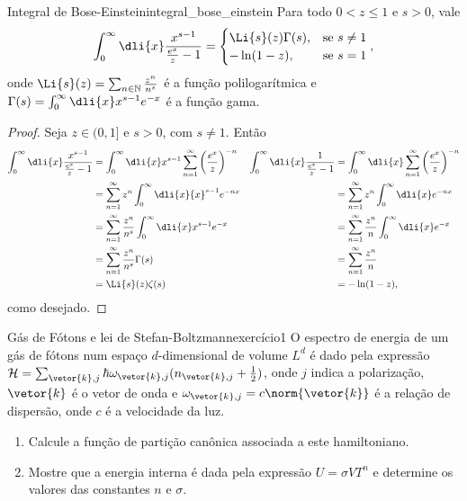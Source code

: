 \begin{lemma}{Integral de Bose-Einstein}{integral_bose_einstein}
    Para todo \(0 < z \leq 1\) e \(s > 0\), vale
    \begin{equation*}
        \int_0^\infty \dli{x} \frac{x^{s-1}}{\frac{e^x}{z} - 1} = \begin{cases}
            \Li{s}(z)\Gamma(s),&\text{se }s \neq 1\\
            -\ln(1 - z),&\text{se }s = 1
        \end{cases},
    \end{equation*}
    onde \(\Li{s}(z) = \sum_{n\in \mathbb{N}}\frac{z^n}{n^s}\) é a função polilogarítmica e \(\Gamma(s) = \int_0^\infty\dli{x} x^{s-1} e^{-x}\) é a função gama.
\end{lemma}
\begin{proof}
    Seja \(z \in (0,1]\) e \(s > 0\), com \(s \neq 1\). Então
    \begin{align*}
        \int_0^\infty \dli{x} \frac{x^{s-1}}{\frac{e^x}{z} - 1} &= \int_0^\infty\dli{x} x^{s-1} \sum_{n = 1}^\infty \left(\frac{e^{x}}{z}\right)^{-n} &
        \int_0^\infty \dli{x} \frac{1}{\frac{e^x}{z} - 1} &= \int_0^\infty\dli{x} \sum_{n = 1}^\infty \left(\frac{e^{x}}{z}\right)^{-n} \\
        &= \sum_{n = 1}^\infty z^{n} \int_0^\infty \dli{x}{x}^{s - 1}e^{-nx} &
        &= \sum_{n = 1}^\infty z^{n} \int_0^\infty \dli{x}e^{-nx} \\
        &= \sum_{n = 1}^\infty \frac{z^n}{n^s} \int_0^\infty \dli{x} x^{s - 1} e^{-x}&
        &= \sum_{n = 1}^\infty \frac{z^n}{n} \int_0^\infty \dli{x} e^{-x}\\
        &= \sum_{n=1}^\infty \frac{z^n}{n^s} \Gamma(s)&
        &= \sum_{n=1}^\infty \frac{z^n}{n}\\
        &= \Li{s}(z)\zeta(s)&
        &= -\ln(1 - z),
    \end{align*}
    como desejado.
\end{proof}
\begin{exercício}{Gás de Fótons e lei de Stefan-Boltzmann}{exercício1}
    O espectro de energia de um gás de fótons num espaço \(d\)-dimensional de volume \(L^d\) é dado pela expressão \(\mathcal{H} = \sum_{\vetor{k}, j} \hbar \omega_{\vetor{k}, j}(n_{\vetor{k}, j} + \frac12)\), onde \(j\) indica a polarização, \(\vetor{k}\) é o vetor de onda e \(\omega_{\vetor{k},j} = c\norm{\vetor{k}}\) é a relação de dispersão, onde \(c\) é a velocidade da luz.
    \begin{enumerate}[label=(\alph*)]
        \item Calcule a função de partição canônica associada a este hamiltoniano.
        \item Mostre que a energia interna é dada pela expressão \(U = \sigma V T^n\) e determine os valores das constantes \(n\) e \(\sigma\).
    \end{enumerate}
\end{exercício}
